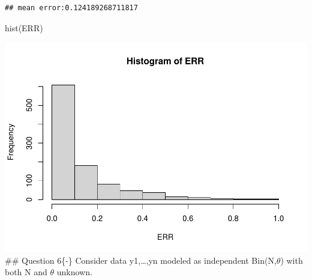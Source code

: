 \documentclass[
]{book}
\newenvironment{Shaded}{\begin{snugshade}}{\end{snugshade}}
\newcommand{\FunctionTok}[1]{\textcolor[rgb]{0.00,0.00,0.00}{#1}}
\newcommand{\NormalTok}[1]{#1}
\theoremstyle{definition}
\theoremstyle{definition}
\theoremstyle{definition}
\theoremstyle{definition}
\theoremstyle{remark}
\begin{document}
\begin{verbatim}
## mean error:0.124189268711817
\end{verbatim}

\begin{Shaded}
\begin{Highlighting}[]
 \FunctionTok{hist}\NormalTok{(ERR)}
\end{Highlighting}
\end{Shaded}

\includegraphics{_main_files/figure-latex/unnamed-chunk-42-1.pdf}
\#\# Question 6\{-\}
Consider data y1,\ldots,yn modeled as independent Bin(N,\(\theta\)) with both N and \(\theta\) unknown.
\end{document}
